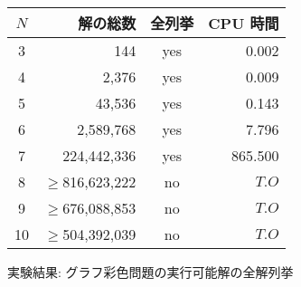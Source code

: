 \begin{tabular}{c|r|c|r}
 $N$ & 解の総数 & 全列挙 & CPU 時間 \\\hline
   3&         144&yes&   0.002\\
   4&       2,376&yes&   0.009\\
   5&      43,536&yes&   0.143\\
   6&   2,589,768&yes&   7.796\\
   7& 224,442,336&yes& 865.500\\
   8& $\geq$816,623,222 &no&$T.O$\\
   9& $\geq$676,088,853 &no&$T.O$\\
  10& $\geq$504,392,039 &no&$T.O$\\\hline
\end{tabular}
\caption{実験結果: グラフ彩色問題の実行可能解の全解列挙}
\label{table:enum}
